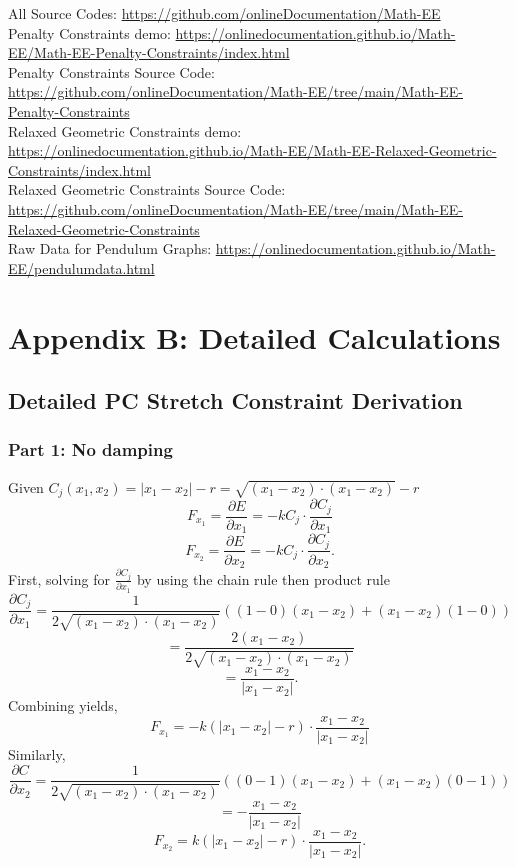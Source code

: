 \documentclass[12pt, letterpaper]{article}
\begin{document}
\noindent All Source Codes:  \url{https://github.com/onlineDocumentation/Math-EE} \\

\noindent Penalty Constraints demo: \url{https://onlinedocumentation.github.io/Math-EE/Math-EE-Penalty-Constraints/index.html} \\

\noindent Penalty Constraints Source Code: \url{https://github.com/onlineDocumentation/Math-EE/tree/main/Math-EE-Penalty-Constraints} \\

\noindent Relaxed Geometric Constraints demo: \url{https://onlinedocumentation.github.io/Math-EE/Math-EE-Relaxed-Geometric-Constraints/index.html}\\

\noindent Relaxed Geometric  Constraints Source Code: \url{https://github.com/onlineDocumentation/Math-EE/tree/main/Math-EE-Relaxed-Geometric-Constraints}\\

\noindent Raw Data for Pendulum Graphs: \url{https://onlinedocumentation.github.io/Math-EE/pendulumdata.html }

\clearpage

\section{Appendix B: Detailed Calculations}
\subsection{Detailed PC Stretch Constraint Derivation}
\subsubsection{Part 1: No damping}

Given $C_j(x_{1},x_{2}) = |x_{1}-x_{2}|-r= \sqrt{(x_{1}-x_{2}) \cdot (x_{1}-x_{2})} - r$
$$F_{x_{1}}=\frac{\partial E}{\partial x_{1}}=-kC_j\cdot \frac{\partial C_j}{\partial x_{1}}$$
$$F_{x_{2}}=\frac{\partial E}{\partial x_{2}}=-kC_j\cdot \frac{\partial C_j}{\partial x_{2}}.$$
First, solving for $\frac{\partial C_j}{\partial x_{1}}$ by using the chain rule then product rule
$$\frac{\partial C_j}{\partial x_{1}} = \frac{1}{2 \sqrt{(x_{1}-x_{2}) \cdot (x_{1}-x_{2})}} ((1-0)(x_{1}-x_{2}) + (x_{1}-x_{2})(1-0))$$
$$= \frac{2(x_{1}-x_{2})}{2 \sqrt{(x_{1}-x_{2}) \cdot (x_{1}-x_{2})}}$$
$$=\frac{x_{1}-x_{2}}{|x_{1}-x_{2}|}.$$
Combining yields,
$$F_{x_{1}} = -k( |x_{1}-x_{2}|-r) \cdot \frac{x_{1}-x_{2}}{|x_{1}-x_{2}|}$$
Similarly,
$$\frac{\partial C}{\partial x_{2}} = \frac{1}{2 \sqrt{(x_{1}-x_{2}) \cdot (x_{1}-x_{2})}} ((0 -1)(x_{1}-x_{2}) + (x_{1}-x_{2})(0 - 1))$$ $$ =- \frac{x_{1}-x_{2}}{|x_{1}-x_{2}|}$$
$$F_{x_{2}} = k( |x_{1}-x_{2}|-r) \cdot \frac{x_{1}-x_{2}}{|x_{1}-x_{2}|}.$$
\end{document}
